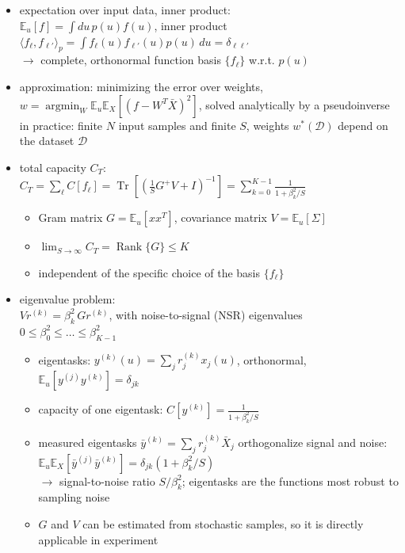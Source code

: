 \begin{itemize}
\begin{itemize}
        \item linear estimator and MSE are intentional: measures the ability of the physical system itself, not of a nonlinear post-processing layer
        \item the distribution of the measured features is fixed by the quantum state $\hat{\rho}(u;\theta)$, hence by the input embedding
    \end{itemize}
    \item expectation over input data, inner product: \\
    $\mathbb{E}_u[f] = \int du\, p(u) f(u)$, inner product $\langle f_\ell, f_{\ell'} \rangle_p = \int f_\ell(u) f_{\ell'}(u) p(u)\, du = \delta_{\ell\ell'}$ \\
    $\to$ complete, orthonormal function basis $\{f_\ell\}$ w.r.t. $p(u)$
    \item approximation: minimizing the error over weights, $w = \operatorname{argmin}_W \mathbb{E}_u\mathbb{E}_X[(f - W^T\bar{X})^2]$, solved analytically by a pseudoinverse \\
    in practice: finite $N$ input samples and finite $S$, weights $w^*(\mathcal{D})$ depend on the dataset $\mathcal{D}$
    \item total capacity $C_T$: \\
    $C_T = \sum_{\ell} C[f_\ell] = \operatorname{Tr}\left[\left(\frac{1}{S}G^{+}V + I\right)^{-1}\right] = \sum_{k=0}^{K-1} \frac{1}{1 + \beta_k^2/S}$
    \begin{itemize}
        \item Gram matrix $G = \mathbb{E}_u[x x^T]$, covariance matrix $V = \mathbb{E}_u[\Sigma]$
        \item $\lim_{S\to\infty} C_T = \operatorname{Rank}\{G\} \le K$
        \item independent of the specific choice of the basis $\{f_\ell\}$
    \end{itemize}
    \item eigenvalue problem: \\
    $V r^{(k)} = \beta_k^2\, G r^{(k)}$, with noise-to-signal (NSR) eigenvalues $0 \le \beta_0^2 \le \dots \le \beta_{K-1}^2$
    \begin{itemize}
        \item eigentasks: $y^{(k)}(u) = \sum_j r_j^{(k)} x_j(u)$, orthonormal, $\mathbb{E}_u[y^{(j)}y^{(k)}] = \delta_{jk}$
        \item capacity of one eigentask: $C[y^{(k)}] = \frac{1}{1 + \beta_k^2/S}$
        \item measured eigentasks $\bar{y}^{(k)} = \sum_j r_j^{(k)}\bar{X}_j$ orthogonalize signal and noise: $\mathbb{E}_u\mathbb{E}_X[\bar{y}^{(j)}\bar{y}^{(k)}] = \delta_{jk}(1 + \beta_k^2/S)$ \\
        $\to$ signal-to-noise ratio $S/\beta_k^2$; eigentasks are the functions most robust to sampling noise
        \item $G$ and $V$ can be estimated from stochastic samples, so it is directly applicable in experiment
    \end{itemize}
\end{itemize}

